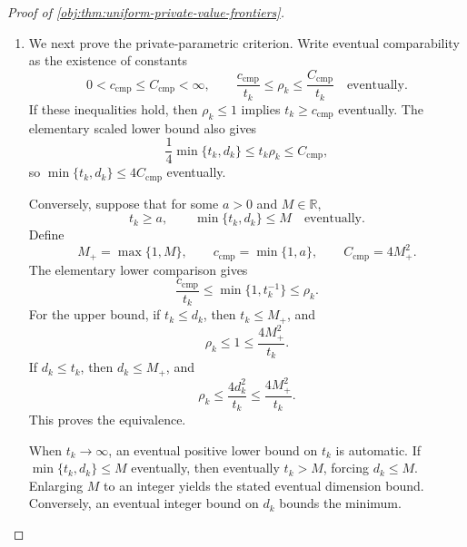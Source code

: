 \begin{proof}[Proof of \cref{obj:thm:uniform-private-value-frontiers}]
\begin{enumerate}
Suppose \(\rho_k\to0\). The elementary lower comparison forces \(t_k\to\infty\): for any real threshold \(M_{\mathrm{test}}\), if
\(t_k<M_{\mathrm{test}}\), then
\[
\rho_k\ge
\min\{1,t_k^{-1}\}
\ge\frac1{\max\{M_{\mathrm{test}},1\}}>0.
\]
Such indices are eventually excluded by convergence to zero.
Eventually \(\rho_k<1\), and the first numerical inequality gives
\[
0\le g_k\le\sqrt{\rho_k}\longrightarrow0.
\]

Conversely, suppose \(t_k\to\infty\) and \(g_k\to0\). Fix a tolerance
\(\zeta>0\), and define
\[
q_{\mathrm{cons}}=\frac{\sqrt{\zeta}}4.
\]
Choose an integer \(D_{\mathrm{cons}}\) such that, for every
\(d\ge D_{\mathrm{cons}}\),
\[
e_{\mathrm{corr}}(d)<q_{\mathrm{cons}},
\qquad
\frac1{\log(ed)}<q_{\mathrm{cons}}.
\]
Eventually,
\[
g_k<q_{\mathrm{cons}},
\qquad
t_k\ge\frac{4D_{\mathrm{cons}}^2}{\zeta}+1.
\]
If \(d_k\ge D_{\mathrm{cons}}\), the numerical upper bound gives
\[
\rho_k<(2q_{\mathrm{cons}})^2+q_{\mathrm{cons}}^2
=\frac{5\zeta}{16}<\zeta.
\]
If \(d_k<D_{\mathrm{cons}}\), the elementary comparison gives
\[
\rho_k\le\frac{4d_k^2}{t_k}
\le\frac{4D_{\mathrm{cons}}^2}{t_k}<\zeta.
\]
Thus \(\rho_k\to0\), establishing the criterion for arbitrary allowed sequences.

\item
We next prove the private-parametric criterion. Write eventual comparability as the existence of constants
\[
0<c_{\mathrm{cmp}}\le C_{\mathrm{cmp}}<\infty,
\qquad
\frac{c_{\mathrm{cmp}}}{t_k}\le\rho_k
\le\frac{C_{\mathrm{cmp}}}{t_k}
\quad\text{eventually}.
\]
If these inequalities hold, then \(\rho_k\le1\) implies
\(t_k\ge c_{\mathrm{cmp}}\) eventually. The elementary scaled lower bound also gives
\[
\frac14\min\{t_k,d_k\}\le t_k\rho_k\le C_{\mathrm{cmp}},
\]
so \(\min\{t_k,d_k\}\le4C_{\mathrm{cmp}}\) eventually.

Conversely, suppose that for some \(a>0\) and \(M\in\mathbb R\),
\[
t_k\ge a,\qquad \min\{t_k,d_k\}\le M
\quad\text{eventually}.
\]
Define
\[
M_+=\max\{1,M\},\qquad
c_{\mathrm{cmp}}=\min\{1,a\},\qquad
C_{\mathrm{cmp}}=4M_+^2.
\]
The elementary lower comparison gives
\[
\frac{c_{\mathrm{cmp}}}{t_k}
\le\min\{1,t_k^{-1}\}\le\rho_k.
\]
For the upper bound, if \(t_k\le d_k\), then \(t_k\le M_+\), and
\[
\rho_k\le1\le\frac{4M_+^2}{t_k}.
\]
If \(d_k\le t_k\), then \(d_k\le M_+\), and
\[
\rho_k\le\frac{4d_k^2}{t_k}
\le\frac{4M_+^2}{t_k}.
\]
This proves the equivalence.

When \(t_k\to\infty\), an eventual positive lower bound on \(t_k\) is automatic. If \(\min\{t_k,d_k\}\le M\) eventually, then eventually \(t_k>M\), forcing \(d_k\le M\). Enlarging \(M\) to an integer yields the stated eventual dimension bound. Conversely, an eventual integer bound on \(d_k\) bounds the minimum.


\end{enumerate}
\end{proof}

